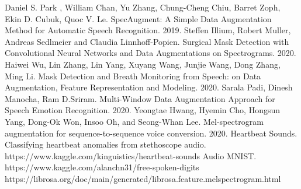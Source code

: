 \documentclass[12pt, fleqn]{article}
\begin{document}
\begin{thebibliography}{3}
	Daniel S. Park
	, William Chan, Yu Zhang, Chung-Cheng Chiu,
	Barret Zoph, Ekin D. Cubuk, Quoc V. Le. SpecAugment: A Simple Data Augmentation Method
	for Automatic Speech Recognition. 2019.
	Steffen Illium, Robert Muller, Andreas Sedlmeier and Claudia Linnhoff-Popien. Surgical Mask Detection with Convolutional Neural Networks and Data
	Augmentations on Spectrograms. 2020.
	 Haiwei Wu, Lin Zhang, Lin Yang, Xuyang Wang, Junjie Wang, Dong Zhang, Ming Li. Mask Detection and Breath Monitoring from Speech: on Data Augmentation,
	Feature Representation and Modeling. 2020.
	 Sarala Padi, Dinesh Manocha, Ram D.Sriram. Multi-Window Data Augmentation Approach for Speech Emotion Recognition. 2020.
	Yeongtae Hwang, Hyemin Cho, Hongsun Yang, Dong-Ok Won, Insoo Oh, and Seong-Whan Lee. Mel-spectrogram augmentation for sequence-to-sequence voice conversion. 2020.
	Heartbeat Sounds. Classifying heartbeat anomalies from stethoscope audio. \newline
	https://www.kaggle.com/kinguistics/heartbeat-sounds
	Audio MNIST. \newline
	https://www.kaggle.com/alanchn31/free-spoken-digits
	https://librosa.org/doc/main/generated/librosa.feature.melspectrogram.html
\end{thebibliography}
\end{document}

